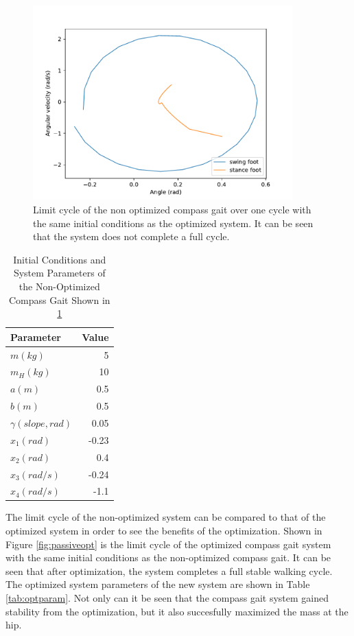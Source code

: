 \documentclass[smallextended]{./springer/svjour3}
\begin{document}
\begin{figure}[h]
\centering
\includegraphics[width=10cm]{./figures/nonopt_limitcycle.pdf}
\caption{Limit cycle of the non optimized compass gait over one cycle with the same initial conditions as the optimized system. It can be seen that the system does not 
complete a full cycle.}
\label{fig:nonoptlimcycle}
\end{figure}

\begin{table}[h]
\centering
\caption{Initial Conditions and System Parameters of the Non-Optimized Compass Gait Shown in \ref{fig:nonoptlimcycle}}
\begin{tabular}{lr}
\toprule
Parameter & Value \\
\midrule
$m (kg)$ & 5 \\
$m_H (kg)$ & 10 \\
$a (m)$ & 0.5 \\
$b (m)$ & 0.5 \\
$\gamma (slope, rad)$ & 0.05 \\
$x_1 (rad)$ & -0.23 \\
$x_2 (rad)$ & 0.4 \\
$x_3 (rad/s)$ & -0.24 \\
$x_4 (rad/s)$ & -1.1 \\
\bottomrule
\end{tabular}
\label{tab:nonoptparam}
\end{table}

The limit cycle of the non-optimized system can be compared to that of the optimized system in order to see the benefits of the optimization.
Shown in Figure \ref{fig:passiveopt} is the limit cycle of the optimized compass gait system with the same initial conditions as the non-optimized compass gait.
It can be seen that after optimization, the system completes a full stable walking cycle.
The optimized system parameters of the new system are shown in Table \ref{tab:optparam}. Not only can it be seen that the compass gait system gained stability from the 
optimization, but it also succesfully maximized the mass at the hip.
\end{document}
